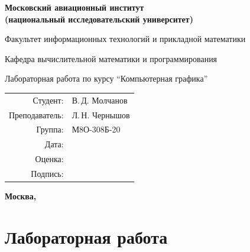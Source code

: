 \documentclass[12pt, a4paper]{article}
\begin{document}
    \begin{titlepage}

        \begin{center}

            \bfseries
            {\Large Московский авиационный институт\\ 
            (национальный исследовательский университет)}

            \vspace{48pt}
            {\large Факультет информационных технологий и прикладной 
            математики}
            
            \vspace{36pt}
            {\large Кафедра вычислительной математики и программирования}
            
            \vspace{48pt}
            Лабораторная работа  по курсу 
            \enquote{Компьютерная графика}
            
        \end{center}
        
        \vspace{72pt}
        \begin{flushright}
            \begin{tabular}{rl}
                Студент: & В.\,Д. Молчанов   \\
                Преподаватель: & Л.\,Н. Чернышов \\
                Группа: & М8О-308Б-20 \\
                Дата: & \\
                Оценка: & \\
                Подпись: & \\
            \end{tabular}
        \end{flushright}
        
        \vfill
        
        \begin{center}
            
            \bfseries
            Москва, \the\year
        
        \end{center}

    \end{titlepage}
        
    \pagebreak

    \section*{Лабораторная работа }
\end{document}
